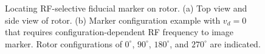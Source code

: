 \documentclass[journal]{IEEEtran}
\begin{document}
\begin{figure}
\begin{center}
\end{center}
\caption{Locating RF-selective fiducial marker on rotor. (a) Top view and side view of rotor. (b) Marker configuration example with $v_d=0$ that requires configuration-dependent RF frequency to image marker.  Rotor configurations of $0^\circ$, $90^\circ$, $180^\circ$, and $270^\circ$ are indicated.}
\vspace{-10pt}
\end{figure}
\end{document}

